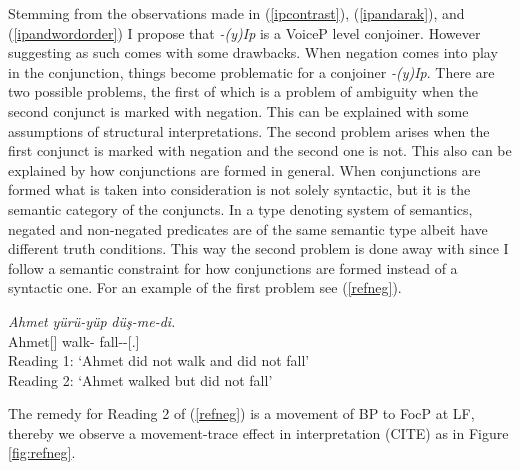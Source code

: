 Stemming from the observations made in (\ref{ipcontrast}), (\ref{ipandarak}), and (\ref{ipandwordorder}) I propose that \textit{-(y)Ip} is a VoiceP level conjoiner. However suggesting as such comes with some drawbacks. When negation comes into play in the conjunction, things become problematic for a conjoiner \textit{-(y)Ip}. There are two possible problems, the first of which is a problem of ambiguity when the second conjunct is marked with negation. This can be explained with some assumptions of structural interpretations. The second problem arises when the first conjunct is marked with negation and the second one is not. This also can be explained by how conjunctions are formed in general. When conjunctions are formed what is taken into consideration is not solely syntactic, but it is the semantic category of the conjuncts. In a type denoting system of semantics, negated and non-negated predicates are of the same semantic type albeit have different truth conditions. This way the second problem is done away with since I follow a semantic constraint for how conjunctions are formed instead of a syntactic one. For an example of the first problem see (\ref{refneg}).
\begin{exe}
    \ex \label{refneg}
    \gll 
    \textit{Ahmet} \textit{yürü-yüp} \textit{düş-me-di.} \\ Ahmet[{\Nom}] walk-{\Pc} fall-{\Neg}-{\Pst}[{\Third}.{\Sg}] \\
    \glt Reading 1: `Ahmet did not walk and did not fall' \\ Reading 2: `Ahmet walked but did not fall'
\end{exe}

The remedy for Reading 2 of (\ref{refneg}) is a movement of BP to FocP at LF, thereby we observe a movement-trace effect in interpretation (CITE) as in Figure \ref{fig:refneg}.

